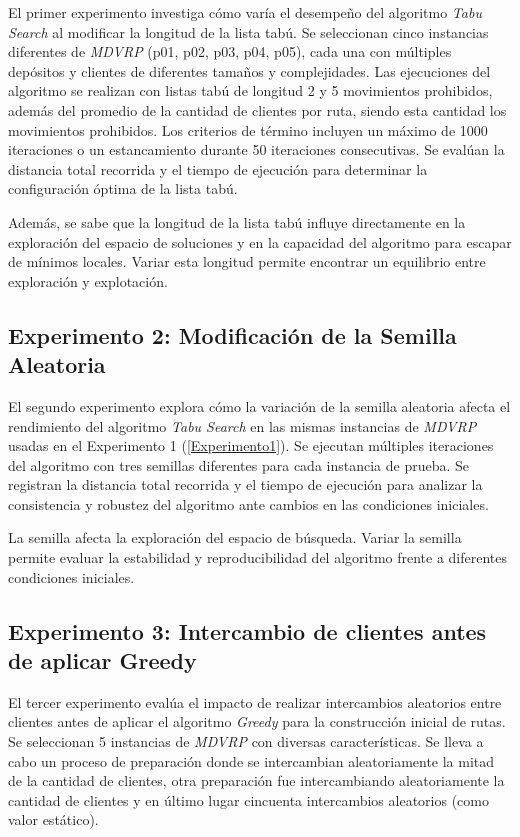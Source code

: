 \documentclass[letter, 10pt]{article}
\begin{document}
El primer experimento investiga cómo varía el desempeño del algoritmo \textit{Tabu Search} al modificar la longitud de la lista tabú. Se seleccionan cinco instancias diferentes de \textit{MDVRP} (p01, p02, p03, p04, p05), cada una con múltiples depósitos y clientes de diferentes tamaños y complejidades. Las ejecuciones del algoritmo se realizan con listas tabú de longitud 2 y 5 movimientos prohibidos, además del promedio de la cantidad de clientes por ruta, siendo esta cantidad los movimientos prohibidos. Los criterios de término incluyen un máximo de 1000 iteraciones o un estancamiento durante 50 iteraciones consecutivas. Se evalúan la distancia total recorrida y el tiempo de ejecución para determinar la configuración óptima de la lista tabú.

Además, se sabe que la longitud de la lista tabú influye directamente en la exploración del espacio de soluciones y en la capacidad del algoritmo para escapar de mínimos locales. Variar esta longitud permite encontrar un equilibrio entre exploración y explotación.

\subsection{Experimento 2: Modificación de la Semilla Aleatoria}

El segundo experimento explora cómo la variación de la semilla aleatoria afecta el rendimiento del algoritmo \textit{Tabu Search} en las mismas instancias de \textit{MDVRP} usadas en el Experimento 1 (\ref{Experimento1}). Se ejecutan múltiples iteraciones del algoritmo con tres semillas diferentes para cada instancia de prueba. Se registran la distancia total recorrida y el tiempo de ejecución para analizar la consistencia y robustez del algoritmo ante cambios en las condiciones iniciales.

La semilla afecta la exploración del espacio de búsqueda. Variar la semilla permite evaluar la estabilidad y reproducibilidad del algoritmo frente a diferentes condiciones iniciales.

\subsection{Experimento 3: Intercambio de clientes antes de aplicar Greedy}

El tercer experimento evalúa el impacto de realizar intercambios aleatorios entre clientes antes de aplicar el algoritmo \textit{Greedy} para la construcción inicial de rutas. Se seleccionan 5 instancias de \textit{MDVRP} con diversas características. Se lleva a cabo un proceso de preparación donde se intercambian aleatoriamente la mitad de la cantidad de clientes, otra preparación fue intercambiando aleatoriamente la cantidad de clientes y en último lugar cincuenta intercambios aleatorios (como valor estático).
\end{document}

